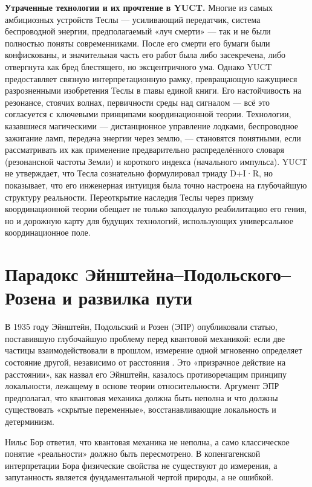 \documentclass[12pt,a4paper]{article}
\begin{document}
	\textbf{Утраченные технологии и их прочтение в YUCT.} Многие из самых амбициозных устройств Теслы — усиливающий передатчик, система беспроводной энергии, предполагаемый «луч смерти» — так и не были полностью поняты современниками. После его смерти его бумаги были конфискованы, и значительная часть его работ была либо засекречена, либо отвергнута как бред блестящего, но эксцентричного ума. Однако YUCT предоставляет связную интерпретационную рамку, превращающую кажущиеся разрозненными изобретения Теслы в главы единой книги. Его настойчивость на резонансе, стоячих волнах, первичности среды над сигналом — всё это согласуется с ключевыми принципами координационной теории. Технологии, казавшиеся магическими — дистанционное управление лодками, беспроводное зажигание ламп, передача энергии через землю, — становятся понятными, если рассматривать их как применение предварительно распределённого словаря (резонансной частоты Земли) и короткого индекса (начального импульса). YUCT не утверждает, что Тесла сознательно формулировал триаду D+I·R, но показывает, что его инженерная интуиция была точно настроена на глубочайшую структуру реальности. Переоткрытие наследия Теслы через призму координационной теории обещает не только запоздалую реабилитацию его гения, но и дорожную карту для будущих технологий, использующих универсальное координационное поле.
	
	\section{Парадокс Эйнштейна–Подольского–Розена и развилка пути}
	
	В 1935 году Эйнштейн, Подольский и Розен (ЭПР) опубликовали статью, поставившую глубочайшую проблему перед квантовой механикой: если две частицы взаимодействовали в прошлом, измерение одной мгновенно определяет состояние другой, независимо от расстояния \cite{EPR1935}. Это «призрачное действие на расстоянии», как назвал его Эйнштейн, казалось противоречащим принципу локальности, лежащему в основе теории относительности. Аргумент ЭПР предполагал, что квантовая механика должна быть неполна и что должны существовать «скрытые переменные», восстанавливающие локальность и детерминизм.
	
	Нильс Бор ответил, что квантовая механика не неполна, а само классическое понятие «реальности» должно быть пересмотрено. В копенгагенской интерпретации Бора физические свойства не существуют до измерения, а запутанность является фундаментальной чертой природы, а не ошибкой.
	
\end{document}
